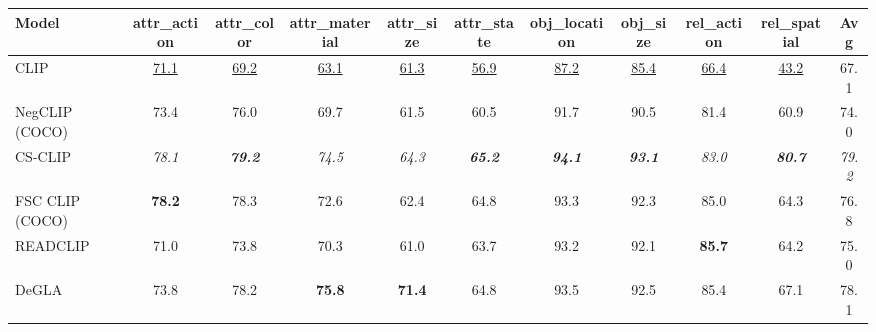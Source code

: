 \begin{tabular}{lcccccccccc}
\toprule
Model & attr\_action & attr\_color & attr\_material & attr\_size & attr\_state & obj\_location & obj\_size & rel\_action & rel\_spatial & Avg \\
\midrule
CLIP & \underline{71.1} & \underline{69.2} & \underline{63.1} & \underline{61.3} & \underline{56.9} & \underline{87.2} & \underline{85.4} & \underline{66.4} & \underline{43.2} & 67.1 \\
NegCLIP (COCO) & 73.4 & 76.0 & 69.7 & 61.5 & 60.5 & 91.7 & 90.5 & 81.4 & 60.9 & 74.0 \\
CS-CLIP & \emph{78.1} & \emph{\textbf{79.2}} & \emph{74.5} & \emph{64.3} & \emph{\textbf{65.2}} & \emph{\textbf{94.1}} & \emph{\textbf{93.1}} & \emph{83.0} & \emph{\textbf{80.7}} & \emph{79.2} \\
FSC CLIP (COCO) & \textbf{78.2} & 78.3 & 72.6 & 62.4 & 64.8 & 93.3 & 92.3 & 85.0 & 64.3 & 76.8 \\
READCLIP & 71.0 & 73.8 & 70.3 & 61.0 & 63.7 & 93.2 & 92.1 & \textbf{85.7} & 64.2 & 75.0 \\
DeGLA & 73.8 & 78.2 & \textbf{75.8} & \textbf{71.4} & 64.8 & 93.5 & 92.5 & 85.4 & 67.1 & 78.1 \\
\bottomrule
\end{tabular}